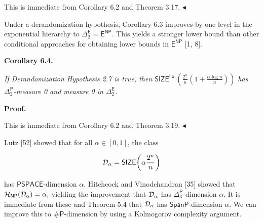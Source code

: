 \documentclass[10pt,a4paper]{article}
\begin{document}
This is immediate from Corollary 6.2 and Theorem 3.17.
$\blacktriangleleft$\par




Under a derandomization hypothesis, Corollary 6.3 improves by one level in the exponential hierarchy to $\Delta^{\mathsf{E}}_{2}=\mathsf{E}^{\mathsf{NP}}$. This yields a stronger lower bound than other conditional approaches for obtaining lower bounds in $\mathsf{E}^{\mathsf{NP}}$ [1, 8].\par





\par\medskip\noindent\textbf{
\textbf{Corollary 6.4}\textbf{.}
}\par



\emph{If Derandomization Hypothesis 2.7 is true, then
$\mathsf{SIZE}^{\mathsf{i.o.}}\!\!\left(\frac{2^{n}}{n}\left(1+\frac{\alpha\log
n}{n}\right)\right)$
has ${\Delta^{\mathsf{P}}_{2}}$-measure 0 and measure 0 in $\Delta^{\mathsf{E}}_{2}$.}\par







\par\medskip\noindent\textbf{Proof.}\par




This is immediate from Corollary 6.2 and Theorem 3.19.
$\blacktriangleleft$\par




Lutz [52] showed that
for all $\alpha\in[0,1]$, the class\par


\[\begin{gathered}
{\cal D}_{\alpha}=\mathsf{SIZE}\!\left(\alpha\frac{2^{n}}{n}\right)
\end{gathered}\]


has $\mathsf{PSPACE}$-dimension $\alpha$. Hitchcock and Vinodchandran [35] showed that
${\cal H}_{\mathsf{NP}}({\cal D}_{\alpha})=\alpha,$
yielding the improvement that ${\cal D}_{\alpha}$ has ${\Delta^{\mathsf{P}}_{3}}$-dimension $\alpha$.
It is immediate from these and Theorem 5.4 that ${\cal D}_{\alpha}$ has $\mathsf{SpanP}$-dimension $\alpha$.
We can improve this to ${\mathsf{\#}\mathsf{P}}$-dimension by using a Kolmogorov complexity argument.\par
\end{document}
